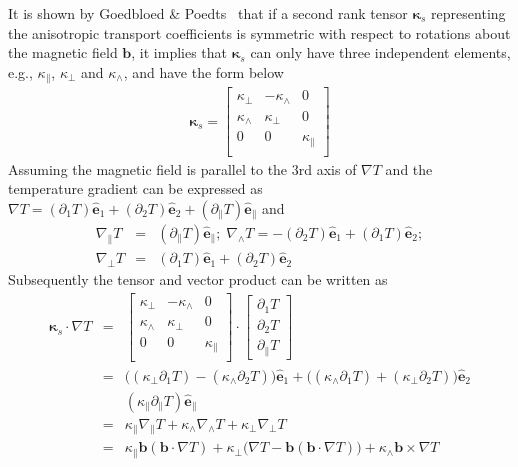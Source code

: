 \documentclass[runningheads]{llncs}
\begin{document}
It is shown by Goedbloed \& Poedts~\cite{goedbloed2004principles} that if a second rank tensor $\bm{\kappa}_s$ representing the anisotropic transport coefficients is symmetric with respect to rotations about the magnetic field $\bm{b}$, it implies that $\bm{\kappa}_s$ can only have three independent elements, e.g., $\kappa_{\parallel}$, $\kappa_{\perp}$ and $\kappa_{\wedge}$, and have the form below
\begin{eqnarray}
\bm{\kappa}_s = \begin{bmatrix}
\kappa_{\perp} & -\kappa_{\wedge} & 0 \\
\kappa_{\wedge} & \kappa_{\perp} & 0 \\
0 & 0 & \kappa_{\parallel}\\
\end{bmatrix}
\end{eqnarray} 
Assuming the magnetic field is parallel to the 3rd axis of $\nabla T$ and the temperature gradient can be expressed as $\nabla T = (\partial_1 T) \bm{\hat{e}}_1 + (\partial_2 T) \bm{\hat{e}}_2 + (\partial_{\parallel} T) \bm{\hat{e}}_{\parallel}$ and
\begin{eqnarray}
\nabla_{\parallel} T &=& (\partial_{\parallel} T) \bm{\hat{e}}_{\parallel}; \; \nabla_{\wedge} T = -(\partial_{2} T) \bm{\hat{e}}_{1} + (\partial_{1} T) \bm{\hat{e}}_{2}; \nonumber\\
 \nabla_{\perp} T &=& (\partial_1 T) \bm{\hat{e}}_1 + (\partial_2 T) \bm{\hat{e}}_2 
\end{eqnarray}
Subsequently the tensor and vector product can be written as
\begin{eqnarray}
\bm{\kappa}_s \cdot \nabla T &=& \begin{bmatrix}
\kappa_{\perp} & -\kappa_{\wedge} & 0 \\
\kappa_{\wedge} & \kappa_{\perp} & 0 \\
0 & 0 & \kappa_{\parallel}\\
\end{bmatrix} \cdot \begin{bmatrix}
\partial_1 T  \\ \partial_2 T \\ \partial_{\parallel} T
\end{bmatrix} \nonumber\\
&=& \big((\kappa_{\perp}\partial_1 T)-(\kappa_{\wedge}\partial_2 T)\big)\bm{\hat{e}}_1 + 
\big((\kappa_{\wedge}\partial_1 T)+(\kappa_{\perp}\partial_2 T)\big)\bm{\hat{e}}_2 \nonumber\\
& & (\kappa_{\parallel}\partial_{\parallel} T)\bm{\hat{e}}_{\parallel} \nonumber\\
&=& \kappa_{\parallel} \nabla_{\parallel} T + \kappa_{\wedge} \nabla_{\wedge} T + \kappa_{\perp} \nabla_{\perp} T \nonumber\\
&=& \kappa_{\parallel} \bm{b}(\bm{b}\cdot \nabla T) + \kappa_{\perp}\big(\nabla T - \bm{b}(\bm{b}\cdot \nabla T)\big) + \kappa_{\wedge}\bm{b}\times\nabla T
\end{eqnarray}
\end{document}
